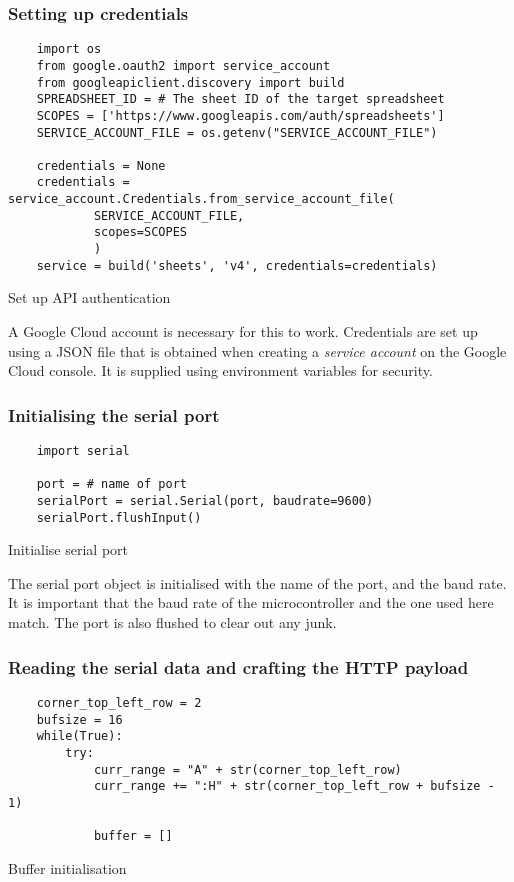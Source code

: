 \documentclass[./RTPostureTrackingReport.tex]{subfiles}
\begin{document}
\subsubsection{Setting up credentials}
\begin{code}
    \begin{verbatim}
    import os
    from google.oauth2 import service_account
    from googleapiclient.discovery import build
    SPREADSHEET_ID = # The sheet ID of the target spreadsheet
    SCOPES = ['https://www.googleapis.com/auth/spreadsheets']
    SERVICE_ACCOUNT_FILE = os.getenv("SERVICE_ACCOUNT_FILE")

    credentials = None
    credentials = service_account.Credentials.from_service_account_file(
            SERVICE_ACCOUNT_FILE,
            scopes=SCOPES
            )
    service = build('sheets', 'v4', credentials=credentials)
    \end{verbatim}
    \caption{Set up API authentication}
    \label{code:apiauth}
\end{code}
\vspace{0.5cm}

A Google Cloud account is necessary for this to work.  Credentials are set up
using a JSON file that is obtained when creating a \textit{service account} on
the Google Cloud console. It is supplied using environment variables for
security.

\subsubsection{Initialising the serial port}
\begin{code}
    \begin{verbatim}
    import serial

    port = # name of port
    serialPort = serial.Serial(port, baudrate=9600)
    serialPort.flushInput()
    \end{verbatim}
    \caption{Initialise serial port}
    \label{code:initser}
\end{code}
\vspace{0.5cm}

The serial port object is initialised with the name of the port, and the baud
rate. It is important that the baud rate of the microcontroller and the one
used here match. The port is also flushed to clear out any junk.

\subsubsection{Reading the serial data and crafting the HTTP payload}
\begin{code}
    \begin{verbatim}
    corner_top_left_row = 2
    bufsize = 16
    while(True):
        try:
            curr_range = "A" + str(corner_top_left_row)
            curr_range += ":H" + str(corner_top_left_row + bufsize - 1)

            buffer = []
    \end{verbatim}
    \caption{Buffer initialisation}
    \label{code:initbuf}
\end{code}
\vspace{0.5cm}
\end{document}
